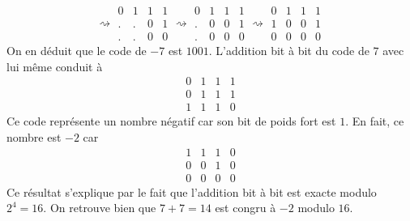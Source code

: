 \begin{enumerate}
\begin{displaymath}
\rightsquigarrow
\begin{aligned}
  0 & 1 & 1 & 1 \\
  . & . & 0 & 1 \\ \hline
  . & . & 0 & 0
\end{aligned}
\rightsquigarrow
\begin{aligned}
  0 & 1 & 1 & 1 \\
  . & 0 & 0 & 1 \\ \hline
  . & 0 & 0 & 0
\end{aligned}
\rightsquigarrow
\begin{aligned}
  0 & 1 & 1 & 1 \\
  1 & 0 & 0 & 1 \\ \hline
  0 & 0 & 0 & 0
\end{aligned}
\end{displaymath}
On en déduit que le code de $-7$ est $1001$.\newline
L'addition bit à bit du code de $7$ avec lui même conduit à 
\begin{displaymath}
  \begin{aligned}
    0 & 1 & 1 & 1 \\
    0 & 1 & 1 & 1 \\ \hline
    1 & 1 & 1 & 0
  \end{aligned}
\end{displaymath}
Ce code représente un nombre négatif car son bit de poids fort est $1$. En fait, ce nombre est $-2$ car
\begin{displaymath}
  \begin{aligned}
    1 & 1 & 1 & 0 \\ 
    0 & 0 & 1 & 0 \\ \hline
    0 & 0 & 0 & 0
  \end{aligned}
\end{displaymath}
Ce résultat s'explique par le fait que l'addition bit à bit est exacte modulo $2^4=16$. On retrouve bien que $7+7=14$ est congru à $-2$ modulo $16$.


\end{enumerate}
